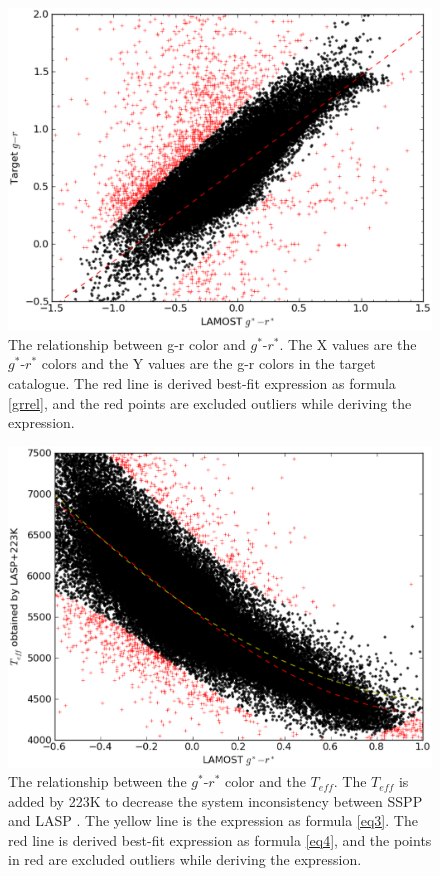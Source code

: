 \documentclass[manuscript]{aastex}
\begin{document}
   \begin{figure}
   \centering
   \includegraphics[width=14cm, angle=0, clip=true]{f1.eps}
   \caption{The relationship between g-r color and $g^*$-$r^*$.
   The X values are the $g^*$-$r^*$ colors and the Y values are the g-r colors  in the target catalogue.
   The red line is  derived best-fit expression as formula \ref{grrel},
   and the red points are excluded outliers while deriving the expression.
   }
   \label{Fig2}
   \end{figure}

   \begin{figure}
   \centering
   \includegraphics[width=14cm, angle=0,clip]{f3.eps}
   \caption{The relationship between the $g^*$-$r^*$  color and the $T_{eff}$.
   The $T_{eff}$ is added by 223K to decrease the system inconsistency between SSPP and LASP \citep{wu2011automatic}.
    The yellow line is the expression as formula \ref{eq3}.
     The red line is  derived best-fit expression as formula \ref{eq4},
     and the points in red are excluded outliers while deriving the expression.   }
   \label{Fig3}
   \end{figure}
\end{document}
